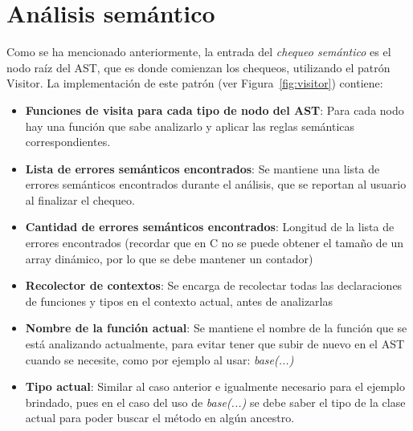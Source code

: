\documentclass{llncs}
\begin{document}
\vspace{10pt}
\section{Análisis semántico}

Como se ha mencionado anteriormente, la entrada del \textit{chequeo semántico} es el nodo raíz del AST, que es donde comienzan los chequeos, utilizando el
patrón Visitor. La implementación de este patrón (ver Figura~\ref{fig:visitor}) contiene: 
\begin{itemize}
    \item \textbf{Funciones de visita para cada tipo de nodo del AST}: Para cada nodo hay una función que sabe analizarlo y aplicar las reglas semánticas correspondientes.
    \item \textbf{Lista de errores semánticos encontrados}: Se mantiene una lista de errores semánticos encontrados durante el análisis, que se reportan al usuario al finalizar el chequeo.
    \item \textbf{Cantidad de errores semánticos encontrados}: Longitud de la lista de errores encontrados (recordar que en C no se puede obtener el tamaño de un array dinámico, por lo que se debe mantener un contador)
    \item \textbf{Recolector de contextos}: Se encarga de recolectar todas las declaraciones de funciones y tipos en el contexto actual, antes de analizarlas
    \item \textbf{Nombre de la función actual}: Se mantiene el nombre de la función que se está analizando actualmente, para evitar tener que subir de nuevo en el AST cuando se necesite, como por ejemplo al usar: \textit{base(...)}
    \item \textbf{Tipo actual}: Similar al caso anterior e igualmente necesario para el ejemplo brindado, pues en el caso del uso de \textit{base(...)} se debe saber el tipo de la clase actual para poder buscar el método en algún ancestro.
\end{itemize}
\end{document}
